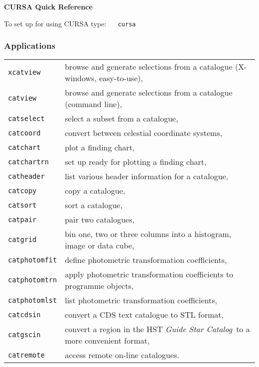 \documentclass[twoside,11pt]{starlink}
\begin{document}
\scfrontmatter

\begin{center}
{\Large\textbf{CURSA Quick Reference}}
\end{center}

To set up for using CURSA type: ~~ \texttt{cursa}

\subsubsection*{Applications}

\begin{tabular}{ll}

\texttt{xcatview}     & browse and generate selections from a catalogue
                     (X-windows, easy-to-use), \\
\texttt{catview}      & browse and generate selections from a catalogue
                     (command line), \\
\texttt{catselect}    & select a subset from a catalogue, \\
\texttt{catcoord}     & convert between celestial coordinate systems, \\
\texttt{catchart}     & plot a finding chart, \\
\texttt{catchartrn}   & set up ready for plotting a finding chart, \\
\texttt{catheader}    & list various header information for a catalogue, \\
\texttt{catcopy}      & copy a catalogue, \\
\texttt{catsort}      & sort a catalogue, \\
\texttt{catpair}      & pair two catalogues, \\
\texttt{catgrid}      & bin one, two or three columns into a histogram,
                     image or data cube, \\
\texttt{catphotomfit} & define photometric transformation coefficients, \\
\texttt{catphotomtrn} & apply photometric transformation coefficients to
                     programme objects, \\
\texttt{catphotomlst} & list photometric transformation coefficients, \\
\texttt{catcdsin}     & convert a CDS text catalogue to STL format, \\
\texttt{catgscin}     & convert a region in the HST \textit{Guide Star Catalog}\,
                     to a more convenient format, \\
\texttt{catremote}    & access remote on-line catalogues. \\
\end{tabular}
\end{document}
